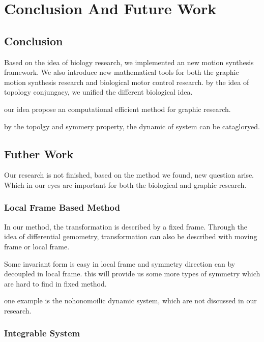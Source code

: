 \def\baselinestretch{1}
\chapter{Conclusion And Future Work}
\label{chap:Conclusiont}
\ifpdf
    \graphicspath{{Conclusions/ConclusionsFigs/PNG/}{Conclusions/ConclusionsFigs/PDF/}{Conclusions/ConclusionsFigs/}}
\else
    \graphicspath{{Conclusions/ConclusionsFigs/EPS/}{Conclusions/ConclusionsFigs/}}
\fi

\def\baselinestretch{1.66}

\section{Conclusion}

Based on the idea of biology research, we implemented an new motion synthesis framework.
We also introduce new mathematical tools for both the graphic motion synthesis research and biological motor control research.
by the idea of topology conjungacy, we unified the different biological idea.

our idea propose an computational efficient method for graphic research.

by the topolgy and symmery property,
the dynamic of system can be catagloryed.




\section{Futher Work}
Our research is not finished, based on the method we found, new question arise.
Which in our eyes are important for both the biological and graphic research.
\subsection{Local Frame Based Method}
In our method, the transformation is described by a fixed frame.
Through the idea of differential gemometry, transformation can also be described with moving frame or local frame.

Some invariant form is easy in local frame and symmetry direction can by decoupled in local frame.
this will provide us  some more types of symmetry which are hard to find in fixed method.

one example is the nohonomoilic dynamic system, which are not discussed in our research.


\subsection{Integrable System}

